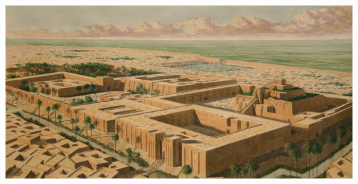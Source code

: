 \vfill
\pagebreak

\begin{center}
	\includegraphics[width=\linewidth]{./IMG/sumerios.jpg}
\end{center}

\vfill
\pagebreak

